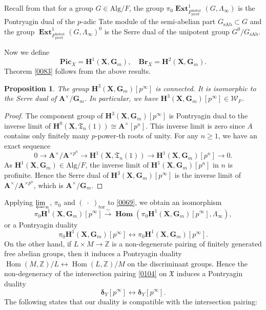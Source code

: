 \documentclass{amsart}
\newtheorem{Prop}[Thm]{Proposition}
\theoremstyle{remark}
\numberwithin{equation}{section}
\newcommand{\isomto}{\overset{\sim}{\to}}
\newcommand{\Z}{\mathbb{Z}}
\newcommand{\et}{\mathrm{et}}
\newcommand{\Gm}{\mathbf{G}_{m}}
\newcommand{\tor}{\mathrm{tor}}
\newcommand{\invlim}{\varprojlim}
\newcommand{\rat}{\mathrm{rat}}
\newcommand{\ind}{\mathrm{ind}}
\newcommand{\pro}{\mathrm{pro}}
\newcommand{\Alg}{\mathrm{Alg}}
\newcommand{\alg}[1]{\mathbf{#1}}
\newcommand{\var}{\;\cdot\;}
\newcommand{\varalg}[1]{\bm{#1}}
\newcommand{\sAb}{\mathrm{sAb}}
\DeclareMathOperator{\Hom}{Hom}
\DeclareMathOperator{\sheafhom}{\alg{Hom}}
\DeclareMathOperator{\sheafext}{\alg{Ext}}
\begin{document}
Recall from \cite[Proposition (2.4.1)]{Suz20}
that for a group $G \in \Alg / F$,
the group $\pi_{0} \sheafext_{F^{\ind\rat}_{\pro\et}}^{1}(G, \Lambda_{\infty})$
is the Pontryagin dual of the $p$-adic Tate module of the semi-abelian part $G_{\sAb} \subset G$
and the group $\sheafext_{F^{\ind\rat}_{\pro\et}}^{1}(G, \Lambda_{\infty})^{0}$
is the Serre dual of the unipotent group $G^{0} / G_{\sAb}$.

Now we define
	\[
			\alg{Pic}_{X}
		=
			\alg{H}^{1}(\alg{X}, \Gm),
		\quad
			\alg{Br}_{X}
		=
			\alg{H}^{2}(\alg{X}, \Gm).
	\]
Theorem \ref{0083} follows from the above results.

\begin{Prop} \label{0110}
	The group $\alg{H}^{3}(\alg{X}, \Gm)[p^{\infty}]$ is connected.
	It is isomorphic to the Serre dual of $\alg{A}^{\times} / \Gm$.
	In particular, we have $\alg{H}^{3}(\alg{X}, \Gm)[p^{\infty}] \in \mathcal{W}_{F}$.
\end{Prop}

\begin{proof}
	The component group of $\alg{H}^{3}(\alg{X}, \Gm)[p^{\infty}]$ is Pontryagin dual to
	the inverse limit of $\alg{H}^{0}(\alg{X}, \mathfrak{T}_{n}(1)) \cong \alg{A}^{\times}[p^{n}]$.
	This inverse limit is zero
	since $A$ contains only finitely many $p$-power-th roots of unity.
	For any $n \ge 1$, we have an exact sequence
		\[
				0
			\to
				\alg{A}^{\times} / \alg{A}^{\times p^{n}}
			\to
				\alg{H}^{1}(\alg{X}, \mathfrak{T}_{n}(1))
			\to
				\alg{H}^{1}(\alg{X}, \Gm)[p^{n}]
			\to
				0.
		\]
	As $\alg{H}^{1}(\alg{X}, \Gm) \in \Alg / F$,
	the inverse limit of $\alg{H}^{1}(\alg{X}, \Gm)[p^{n}]$ in $n$ is profinite.
	Hence the Serre dual of $\alg{H}^{3}(\alg{X}, \Gm)[p^{\infty}]$ is
	the inverse limit of $\alg{A}^{\times} / \alg{A}^{\times p^{n}}$,
	which is $\alg{A}^{\times} / \Gm$.
\end{proof}

Applying $\invlim_{n}$, $\pi_{0}$ and $(\var)_{\tor}$ to \eqref{0069},
we obtain an isomorphism
	\[
			\pi_{0} \alg{H}^{1}(\alg{X}, \Gm)[p^{\infty}]
		\isomto
			\sheafhom(\pi_{0} \alg{H}^{1}(\alg{X}, \Gm)[p^{\infty}], \Lambda_{\infty}),
	\]
or a Pontryagin duality
	\begin{equation} \label{0120}
			\pi_{0} \alg{H}^{1}(\alg{X}, \Gm)[p^{\infty}]
		\leftrightarrow
			\pi_{0} \alg{H}^{1}(\alg{X}, \Gm)[p^{\infty}].
	\end{equation}
On the other hand,
if $L \times M \to \Z$ is a non-degenerate pairing of finitely generated free abelian groups,
then it induces a Pontryagin duality $\Hom(M, \Z) / L \leftrightarrow \Hom(L, \Z) / M$
on the discriminant groups.
Hence the non-degeneracy of the intersection pairing \eqref{0104} on $\mathfrak{X}$
induces a Pontryagin duality
	\begin{equation} \label{0121}
			\varalg{\delta}_{Y}[p^{\infty}]
		\leftrightarrow
			\varalg{\delta}_{Y}[p^{\infty}].
	\end{equation}
The following states that our duality is compatible with the intersection pairing:
\end{document}
